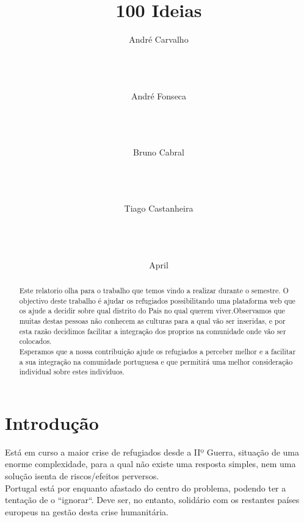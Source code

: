 \documentclass{article}
\title{100 Ideias}
\author{
%
%
\alignauthor
André Carvalho\\
       \affaddr{FCUP - DCC}\\
       \affaddr{Motivation Coach}\\
       \affaddr{Documenter}\\
\and
\alignauthor
André Fonseca\\
       \affaddr{FCUP - DCC}\\
       \affaddr{Task Master}\\
       \affaddr{Developer}\\
\and
\alignauthor Bruno Cabral\\
       \affaddr{FCUP - DCC}\\
       \affaddr{Resources Support}\\
       \affaddr{Researcher}\\
\and  %
\alignauthor Tiago Castanheira\\
       \affaddr{FCUP - DCC}\\
       \affaddr{Mediator}\\
       \affaddr{Architect}\\
}
\date{April}
\begin{document}
\maketitle
\begin{abstract}
    Este relatorio olha para o trabalho que temos vindo a realizar durante o semestre. O objectivo deste  trabalho é ajudar os refugiados possibilitando uma plataforma web que os ajude a decidir sobre qual distrito do Pais no qual querem viver.Observamos que muitas destas pessoas não conhecem as culturas para a qual vão ser inseridas, e por esta razão decidimos facilitar a integração dos proprios na comunidade onde vão ser colocados.\\Esperamos que a nossa contribuição ajude os refugiados a perceber melhor e a facilitar a sua integração na comunidade portuguesa e que permitirá uma melhor consideração individual sobre estes individuos.
    
    
\end{abstract}
\section{Introdução}



    Está em curso a maior crise de refugiados desde a IIº Guerra, situação de uma enorme complexidade, para a qual não existe uma resposta simples, nem uma solução isenta de riscos/efeitos perversos.\\Portugal está por enquanto afastado do centro do problema, podendo ter a tentação de o “ignorar“. Deve ser, no entanto, solidário com os restantes países europeus na gestão desta crise humanitária.
\end{document}
